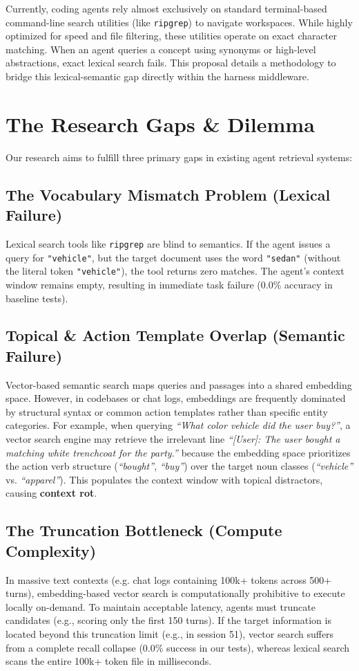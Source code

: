 \documentclass[11pt,a4paper]{article}
\begin{document}
Currently, coding agents rely almost exclusively on standard terminal-based command-line search utilities (like \texttt{ripgrep}) to navigate workspaces. While highly optimized for speed and file filtering, these utilities operate on exact character matching. When an agent queries a concept using synonyms or high-level abstractions, exact lexical search fails. This proposal details a methodology to bridge this lexical-semantic gap directly within the harness middleware.

\section{The Research Gaps & Dilemma}
Our research aims to fulfill three primary gaps in existing agent retrieval systems:

\subsection{The Vocabulary Mismatch Problem (Lexical Failure)}
Lexical search tools like \texttt{ripgrep} are blind to semantics. If the agent issues a query for \texttt{"vehicle"}, but the target document uses the word \texttt{"sedan"} (without the literal token \texttt{"vehicle"}), the tool returns zero matches. The agent's context window remains empty, resulting in immediate task failure (0.0\% accuracy in baseline tests).

\subsection{Topical & Action Template Overlap (Semantic Failure)}
Vector-based semantic search maps queries and passages into a shared embedding space. However, in codebases or chat logs, embeddings are frequently dominated by structural syntax or common action templates rather than specific entity categories. 
For example, when querying \textit{``What color vehicle did the user buy?''}, a vector search engine may retrieve the irrelevant line \textit{``[User]: The user bought a matching white trenchcoat for the party.''} because the embedding space prioritizes the action verb structure (\textit{``bought''}, \textit{``buy''}) over the target noun classes (\textit{``vehicle''} vs. \textit{``apparel''}). This populates the context window with topical distractors, causing \textbf{context rot}.

\subsection{The Truncation Bottleneck (Compute Complexity)}
In massive text contexts (e.g. chat logs containing 100k+ tokens across 500+ turns), embedding-based vector search is computationally prohibitive to execute locally on-demand. To maintain acceptable latency, agents must truncate candidates (e.g., scoring only the first 150 turns). If the target information is located beyond this truncation limit (e.g., in session 51), vector search suffers from a complete recall collapse (0.0\% success in our tests), whereas lexical search scans the entire 100k+ token file in milliseconds.
\end{document}
